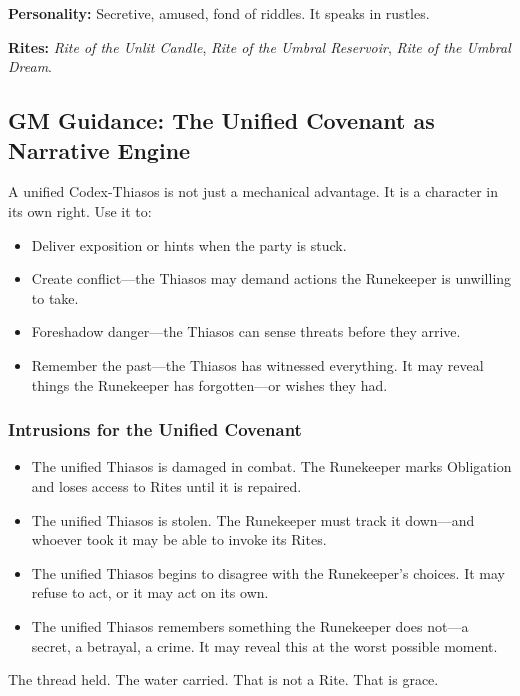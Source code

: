 \textbf{Personality:} Secretive, amused, fond of riddles. It speaks in rustles.

\textbf{Rites:} \textit{Rite of the Unlit Candle}, \textit{Rite of the Umbral Reservoir}, \textit{Rite of the Umbral Dream}.

\subsection{GM Guidance: The Unified Covenant as Narrative Engine}

A unified Codex-Thiasos is not just a mechanical advantage. It is a character in its own right. Use it to:

\begin{itemize}
\item Deliver exposition or hints when the party is stuck.
\item Create conflict—the Thiasos may demand actions the Runekeeper is unwilling to take.
\item Foreshadow danger—the Thiasos can sense threats before they arrive.
\item Remember the past—the Thiasos has witnessed everything. It may reveal things the Runekeeper has forgotten—or wishes they had.
\end{itemize}

\subsubsection{Intrusions for the Unified Covenant}

\begin{itemize}
\item The unified Thiasos is damaged in combat. The Runekeeper marks Obligation and loses access to Rites until it is repaired.
\item The unified Thiasos is stolen. The Runekeeper must track it down—and whoever took it may be able to invoke its Rites.
\item The unified Thiasos begins to disagree with the Runekeeper's choices. It may refuse to act, or it may act on its own.
\item The unified Thiasos remembers something the Runekeeper does not—a secret, a betrayal, a crime. It may reveal this at the worst possible moment.
\end{itemize}

The thread held. The water carried. That is not a Rite. That is grace.
